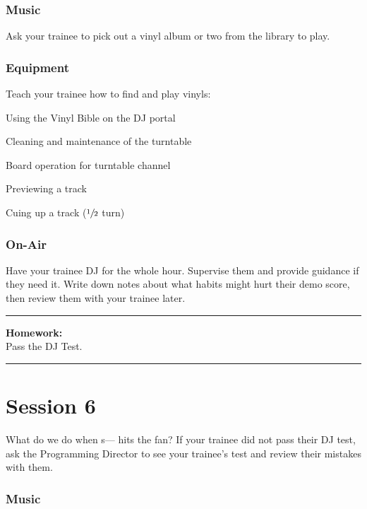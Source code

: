 \documentclass[]{witrman}
\newcommand{\makehomework}[1]{%
    \begin{samepage}
        \vspace{2pt}
        \rule{\textwidth}{1pt}
        \textbf{Homework:}\\
        #1\\
        \rule[3pt]{\textwidth}{1pt}
    \end{samepage}
}
\begin{document}
\subsection{Music}

Ask your trainee to pick out a vinyl album or two from the library to play.

\subsection{Equipment}

Teach your trainee how to find and play vinyls:
\vspace{-\topsep}
\begin{tightitemize}
    \item Using the Vinyl Bible on the DJ portal
    \item Cleaning and maintenance of the turntable
    \item Board operation for turntable channel
    \item Previewing a track
    \item Cuing up a track ($\sfrac{1}{2}$ turn)
\end{tightitemize}

\subsection{On-Air}

Have your trainee DJ for the whole hour.  Supervise them and provide guidance if
they need it.  Write down notes about what habits might hurt their demo score,
then review them with your trainee later.

\makehomework{Pass the DJ Test.}


\chapter{Session 6}

What do we do when s--- hits the fan?  If your trainee did not pass their DJ
test, ask the Programming Director to see your trainee's test and review their
mistakes with them.

\subsection{Music}
\end{document}
